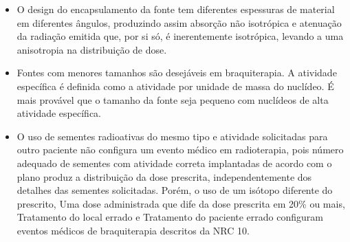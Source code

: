 \documentclass[11pt,a4paper]{article}
\newcounter{exemplo}
\begin{document}
\begin{exemplo}[Braquiterapia]
\begin{itemize}
        \item O design do encapsulamento da fonte tem diferentes espessuras de material em diferentes ângulos, produzindo assim absorção não isotrópica e atenuação da radiação emitida que, por si só, é inerentemente isotrópica, levando a uma anisotropia na distribuição de dose.
        
        \item Fontes com menores tamanhos são desejáveis em braquiterapia. A atividade específica é definida como a atividade por unidade de massa do nuclídeo. É mais provável que o tamanho da fonte seja pequeno com nuclídeos de alta atividade específica.
        
        \item O uso de sementes radioativas do mesmo tipo e atividade solicitadas para outro paciente não configura um evento médico em radioterapia, pois número adequado de sementes com atividade correta implantadas de acordo com o plano produz a distribuição da dose prescrita, independentemente dos detalhes das sementes solicitadas. Porém, o uso de um isótopo diferente do prescrito, Uma dose administrada que dife da dose prescrita em 20\% ou mais,  Tratamento do local errado e Tratamento do paciente errado configuram eventos médicos de braquiterapia descritos da NRC 10.
    \end{itemize}
\end{exemplo}
\end{document}
